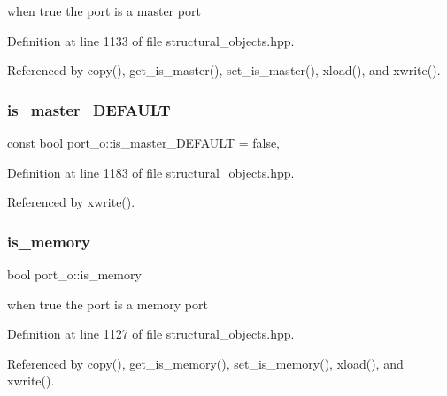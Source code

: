 when true the port is a master port 



Definition at line 1133 of file structural\+\_\+objects.\+hpp.



Referenced by copy(), get\+\_\+is\+\_\+master(), set\+\_\+is\+\_\+master(), xload(), and xwrite().

\mbox{\label{structport__o_a8a870d15493ad262cd6fd987eca99c14}} 
\subsubsection{\texorpdfstring{is\+\_\+master\+\_\+\+D\+E\+F\+A\+U\+LT}{is\_master\_DEFAULT}}
{\footnotesize\ttfamily const bool port\+\_\+o\+::is\+\_\+master\+\_\+\+D\+E\+F\+A\+U\+LT = false\hspace{0.3cm}{\ttfamily [static]}, {\ttfamily [private]}}



Definition at line 1183 of file structural\+\_\+objects.\+hpp.



Referenced by xwrite().

\mbox{\label{structport__o_a77eda83f4541321f72ef13489c10b113}} 
\subsubsection{\texorpdfstring{is\+\_\+memory}{is\_memory}}
{\footnotesize\ttfamily bool port\+\_\+o\+::is\+\_\+memory\hspace{0.3cm}{\ttfamily [private]}}



when true the port is a memory port 



Definition at line 1127 of file structural\+\_\+objects.\+hpp.



Referenced by copy(), get\+\_\+is\+\_\+memory(), set\+\_\+is\+\_\+memory(), xload(), and xwrite().

